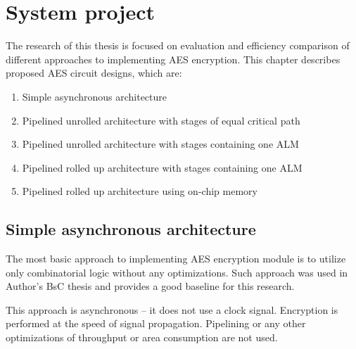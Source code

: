 \section{System project}
\label{sec:system-project}
The research of this thesis is focused on evaluation and efficiency comparison of different approaches to implementing AES encryption. This chapter describes proposed AES circuit designs, which are:

\begin{enumerate}[noitemsep]
\item Simple asynchronous architecture
\item Pipelined unrolled architecture with stages of equal critical path
\item Pipelined unrolled architecture with stages containing one ALM
\item Pipelined rolled up architecture with stages containing one ALM
\item Pipelined rolled up architecture using on-chip memory
\end{enumerate}

\subsection{Simple asynchronous architecture}
The most basic approach to implementing AES encryption module is to utilize only combinatorial logic without any optimizations. Such approach was used in Author's BsC thesis \cite{inzynierka} and provides a good baseline for this research.

This approach is asynchronous -- it does not use a clock signal. Encryption is performed at the speed of signal propagation. Pipelining or any other optimizations of throughput or area consumption are not used.




